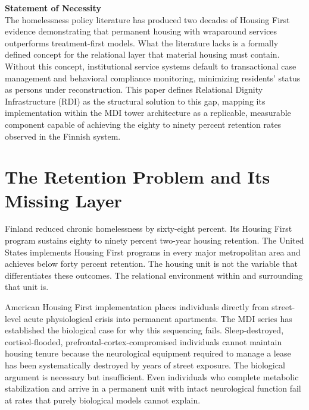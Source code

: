 \documentclass[12pt, letterpaper]{article}
\begin{document}
{\vspace{8pt}
\noindent\textbf{Statement of Necessity}\\[1pt]
The homelessness policy literature has produced two decades of Housing First evidence demonstrating that permanent housing with wraparound services outperforms treatment-first models. What the literature lacks is a formally defined concept for the relational layer that material housing must contain. Without this concept, institutional service systems default to transactional case management and behavioral compliance monitoring, minimizing residents' status as persons under reconstruction. This paper defines Relational Dignity Infrastructure (RDI) as the structural solution to this gap, mapping its implementation within the MDI tower architecture as a replicable, measurable component capable of achieving the eighty to ninety percent retention rates observed in the Finnish system.



}

\newpage
\begingroup
{}
\setlength{\cftbeforesecskip}{2pt}
\setlength{\cftbeforesubsecskip}{-2pt}
\tableofcontents
\endgroup

\newpage
{}

\clearpage
\section{The Retention Problem and Its Missing Layer}

Finland reduced chronic homelessness by sixty-eight percent. Its Housing First program sustains eighty to ninety percent two-year housing retention. The United States implements Housing First programs in every major metropolitan area and achieves below forty percent retention. The housing unit is not the variable that differentiates these outcomes. The relational environment within and surrounding that unit is.

American Housing First implementation places individuals directly from street-level acute physiological crisis into permanent apartments. The MDI series has established the biological case for why this sequencing fails. Sleep-destroyed, cortisol-flooded, prefrontal-cortex-compromised individuals cannot maintain housing tenure because the neurological equipment required to manage a lease has been systematically destroyed by years of street exposure. The biological argument is necessary but insufficient. Even individuals who complete metabolic stabilization and arrive in a permanent unit with intact neurological function fail at rates that purely biological models cannot explain.
\end{document}
